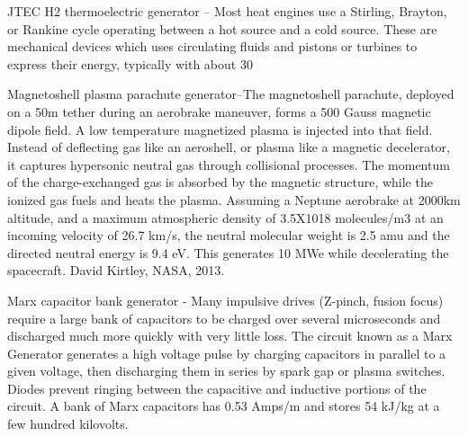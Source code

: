 \documentclass[a4paper]{book}
\begin{document}
JTEC H2 thermoelectric generator – Most heat engines use a Stirling, Brayton, or Rankine cycle operating between a hot source and a cold source. These are mechanical devices which uses circulating fluids and pistons or turbines to express their energy, typically with about 30%
 
Magnetoshell plasma parachute generator–The magnetoshell parachute, deployed on a 50m tether during an aerobrake maneuver, forms a 500 Gauss magnetic dipole field.  A low temperature magnetized plasma is injected into that field. Instead of deflecting gas like an aeroshell, or plasma like a magnetic decelerator, it captures hypersonic neutral gas through collisional processes.  The momentum of the charge-exchanged gas is absorbed by the magnetic structure, while the ionized gas fuels and heats the plasma. Assuming a Neptune aerobrake at 2000km altitude, and a maximum atmospheric density of 3.5X1018 molecules/m3 at an incoming velocity of 26.7 km/s, the neutral molecular weight is 2.5 amu and the directed neutral energy is 9.4 eV. This generates 10 MWe while decelerating the spacecraft. David Kirtley, NASA, 2013.
 
Marx capacitor bank generator - Many impulsive drives (Z-pinch, fusion focus) require a large bank of capacitors to be charged over several microseconds and discharged much more quickly with very little loss. The circuit known as a Marx Generator generates a high voltage pulse by charging capacitors in parallel to a given voltage, then discharging them in series by spark gap or plasma switches. Diodes prevent ringing between the capacitive and inductive portions of the circuit. A bank of Marx capacitors has 0.53 Amps/m and stores 54 kJ/kg at a few hundred kilovolts.
 
\end{document}
